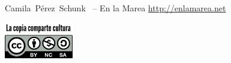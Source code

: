     \newpage
    \thispagestyle{empty}

    \begin{flushleft}\hbox{\Large{Camila Pérez Schunk}}
    \copyleft \, \the\year -- En la Marea
    \url{http://enlamarea.net}

    \vfill

    \centering
    \includegraphics[width=3cm]{assets/images/la_copia_comparte_cultura.png}

    \end{flushleft}
   \newpage

